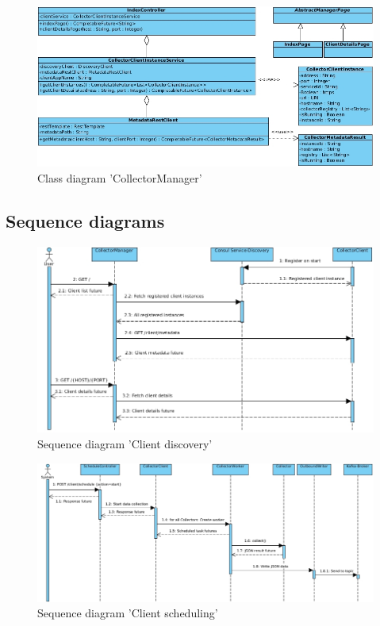 \begin{figure}[H]
	\centering
	\includegraphics[width=1.0\textwidth]{../uml/class-collector-manager.jpg}
	\caption{Class diagram 'CollectorManager'}
	\label{class-diagram-collector-manager}
\end{figure}

\subsection{Sequence diagrams}
\begin{figure}[H]
	\centering
	\includegraphics[width=1.0\textwidth]{../uml/sequence-discovery.jpg}
	\caption{Sequence diagram 'Client discovery'}
	\label{sequence-diagram-client-discovery}
\end{figure}
\begin{figure}[H]
	\centering
	\includegraphics[width=1.0\textwidth]{../uml/sequence-scheduling.jpg}
	\caption{Sequence diagram 'Client scheduling'}
	\label{sequence-diagram-client-scheduling}
\end{figure}

